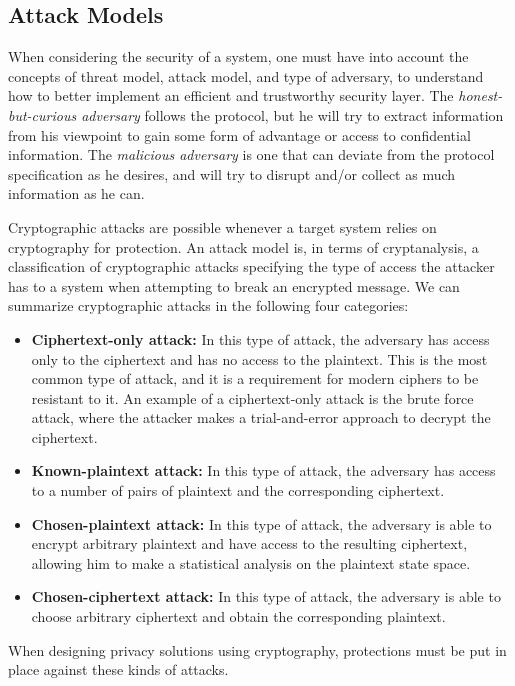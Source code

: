 \subsection{Attack Models}
\label{ssec:AttackModels}

When considering the security of a system, one must have into account the concepts of threat model, attack model, and type of adversary, to understand how to better implement an efficient and trustworthy security layer. The \textit{honest-but-curious adversary} follows the protocol, but he will try to extract information from his viewpoint to gain some form of advantage or access to confidential information.
The \textit{malicious adversary} is one that can deviate from the protocol specification as he desires, and will try to disrupt and/or collect as much information as he can.

Cryptographic attacks are possible whenever a target system relies on cryptography for protection. An attack model is, in terms of cryptanalysis, a classification of cryptographic attacks specifying the type of access the attacker has to a system when attempting to break an encrypted message. We can summarize cryptographic attacks in the following four categories:

 \begin{itemize}

    \item \textbf{Ciphertext-only attack:} In this type of attack, the adversary has access only to the ciphertext and has no access to the plaintext. This is the most common type of attack, and it is a requirement for modern ciphers to be resistant to it. An example of a ciphertext-only attack is the brute force attack, where the attacker makes a trial-and-error approach to decrypt the ciphertext.

    \item \textbf{Known-plaintext attack:} In this type of attack, the adversary has access to a number of pairs of plaintext and the corresponding ciphertext.

    \item \textbf{Chosen-plaintext attack:} In this type of attack, the adversary is able to encrypt arbitrary plaintext and have access to the resulting ciphertext, allowing him to make a statistical analysis on the plaintext state space.

    \item \textbf{Chosen-ciphertext attack:} In this type of attack, the adversary is able to choose arbitrary ciphertext and obtain the corresponding plaintext.
\end{itemize}

When designing privacy solutions using cryptography, protections must be put in place against these kinds of attacks.


